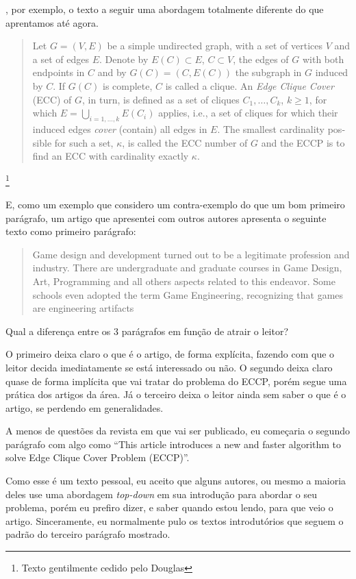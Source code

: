 \documentclass[openany]{book}
\begin{document}
, por exemplo, o texto a seguir uma abordagem totalmente diferente do que aprentamos até agora.

\foreignblockquote{english}{Let $G = (V,E)$ be a simple undirected graph, with a set of vertices $V$ and a set of edges $E$. Denote by $E(C) \subset E$, $C \subset V$, the edges of $G$ with both endpoints in $C$ and by $G(C) = (C,E(C))$ the subgraph in $G$ induced by $C$. If $G(C)$ is complete, $C$ is called a clique. An \textit{Edge Clique Cover} (ECC) of $G$, in turn, is defined as a set of cliques ${C_1,\ldots,C_k}$, $k \geq 1$, for which $E = \bigcup_{i=1,\ldots,k}E(C_i)$ applies, i.e., a set of cliques for which their induced edges \textit{cover} (contain) all edges in $E$. The smallest cardinality possible for such a set, $\kappa$, is called the ECC number of $G$ and the ECCP is to find an ECC with cardinality exactly $\kappa$.}\footnote{Texto gentilmente cedido pelo Douglas}

E, como um exemplo que considero um contra-exemplo do que um bom primeiro parágrafo, um artigo que apresentei com outros autores apresenta o seguinte texto como primeiro parágrafo:

\foreignblockquote{english}{Game design and development turned out to be a legitimate profession and industry. There are undergraduate and graduate courses in Game Design, Art, Programming and all others aspects related to this endeavor. Some schools even adopted the term Game Engineering, recognizing that games are engineering artifacts}

Qual a diferença entre os 3 parágrafos em função de atrair o leitor?

O primeiro deixa claro o que é o artigo, de forma explícita, fazendo com que o leitor decida imediatamente se está interessado ou não. O segundo deixa claro quase de forma implícita que vai tratar do problema do ECCP, porém segue uma prática dos artigos da área. Já o terceiro deixa o leitor ainda sem saber o que é o artigo, se perdendo em generalidades.

A menos de questões da revista em que vai ser publicado, eu começaria o segundo parágrafo com algo como \enquote{This article introduces a new and faster algorithm to solve Edge Clique Cover Problem (ECCP)}.

Como esse é um texto pessoal, eu aceito que alguns autores, ou mesmo a maioria deles use uma abordagem \textit{top-down} em sua introdução para abordar o seu problema, porém eu prefiro dizer, e saber quando estou lendo, para que veio o artigo. Sinceramente, eu normalmente pulo os textos introdutórios que seguem o padrão do terceiro parágrafo mostrado.
\end{document}
